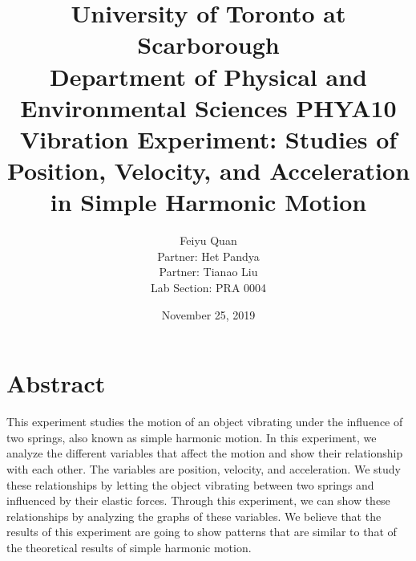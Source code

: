 \documentclass{article}
\begin{document}
\title{\LARGE University of Toronto at Scarborough \\\Large Department of Physical and Environmental Sciences PHYA10\\ \textbf{\huge Vibration Experiment: Studies of Position, Velocity, and Acceleration in Simple Harmonic Motion\\}}
\author{Feiyu Quan \\Partner: Het Pandya \\Partner: Tianao Liu\\Lab Section: PRA 0004\\}
\date{November 25, 2019}

\maketitle

\section{Abstract}
This experiment studies the motion of an object vibrating under the influence of two springs, also known as simple harmonic motion. In this experiment, we analyze the different variables that affect the motion and show their relationship with each other. The variables are position, velocity, and acceleration. We study these relationships by letting the object vibrating between two springs and influenced by their elastic forces. Through this experiment, we can show these relationships by analyzing the graphs of these variables. We believe that the results of this experiment are going to show patterns that are similar to that of the theoretical results of simple harmonic motion.
\end{document}

